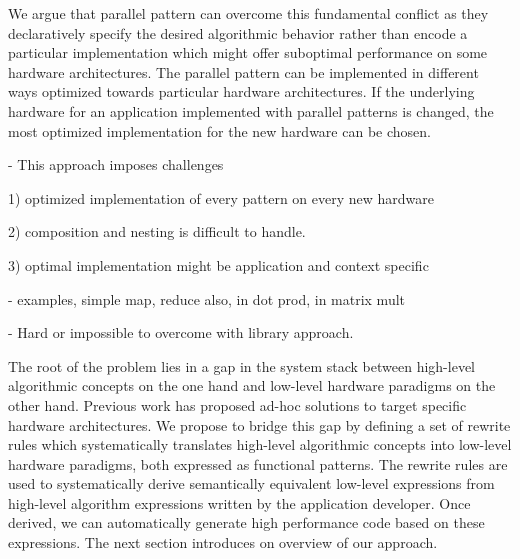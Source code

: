 We argue that parallel pattern can overcome this fundamental conflict as they declaratively specify the desired algorithmic behavior rather than encode a particular implementation which might offer suboptimal performance on some hardware architectures.
The parallel pattern can be implemented in different ways optimized towards particular hardware architectures.
If the underlying hardware for an application implemented with parallel patterns is changed, the most optimized implementation for the new hardware can be chosen.

- This approach imposes challenges

1) optimized implementation of every pattern on every new hardware

2) composition and nesting is difficult to handle.

3) optimal implementation might be application and context specific

- examples, simple map, reduce also, in dot prod, in matrix mult

- Hard or impossible to overcome with library approach.

The root of the problem lies in a gap in the system stack between high-level algorithmic concepts on the one hand and low-level hardware paradigms on the other hand.
Previous work has proposed ad-hoc solutions to target specific hardware architectures.
We propose to bridge this gap by defining a set of rewrite rules which systematically translates high-level algorithmic concepts into low-level hardware paradigms, both expressed as functional patterns.
The rewrite rules are used to systematically derive semantically equivalent low-level expressions from high-level algorithm expressions written by the application developer.
Once derived, we can automatically generate high performance code based on these expressions.
The next section introduces on overview of our approach.
 
